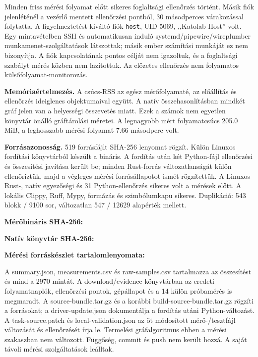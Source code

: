 \documentclass[10pt,a4paper]{article}
\begin{document}
Minden friss mérési folyamat előtt sikeres foglaltsági ellenőrzés történt.
Másik fiók jelenléténél a vezérlő mentett ellenőrzési pontból, 30 másodperces
várakozással folytatta. A figyelmeztetést kiváltó fiók \texttt{host}, UID 5069,
,,Katolab Host'' volt. Egy mintavételben SSH és automatikusan induló
systemd/pipewire/wireplumber munkamenet-szolgáltatások látszottak; másik ember
számítási munkáját ez nem bizonyítja. A fiók kapcsolatának pontos célját nem
igazoltuk, és a foglaltsági szabályt mérés közben nem lazítottuk.
Az előzetes ellenőrzés nem folyamatos külsőfolyamat-monitorozás.

\textbf{Memóriaértelmezés.} A csúcs-RSS az egész mérőfolyamaté, az előállítás és
ellenőrzés ideiglenes objektumaival együtt. A natív összehasonlításban mindkét gráf
jelen van a helyességi összevetés miatt. Ezek a számok nem egyetlen könyvtár
önálló gráftárolási méretei. A legnagyobb mért folyamatcsúcs 205.0 MiB, a
leghosszabb mérési folyamat 7.66 másodperc volt.

\textbf{Forrásazonosság.} 519 forrásfájlt SHA-256 lenyomat rögzít. Külön Linuxos
fordítási könyvtárból készült a bináris. A fordítás után két Python-fájl ellenőrzési
és összesítési javítása került be; minden Rust-forrás változatlanságát külön
ellenőriztük, majd a végleges mérési forrásállapotot ismét rögzítettük.
A Linuxos Rust-, natív egyezőségi és 31 Python-ellenőrzés sikeres volt a mérések előtt.
A lokális Clippy, Ruff, Mypy, formázás és szimbólumkapu sikeres.
Duplikáció: 543 blokk / 9100 sor, változatlan 547 / 12629 alapérték mellett.

\textbf{Mérőbináris SHA-256:} 

\textbf{Natív könyvtár SHA-256:} 

\textbf{Mérési forráskészlet tartalomlenyomata:} 

A summary.json, measurements.csv és raw-samples.csv tartalmazza az összesítést és
mind a 2970 mintát. A download/evidence könyvtárban az eredeti folyamatnaplók,
ellenőrzési pontok, gépállapot és a 14 külön próbamérés is megmaradt.
A source-bundle.tar.gz és a korábbi build-source-bundle.tar.gz rögzíti a forrásokat;
a driver-update.json dokumentálja a fordítás utáni Python-változást.
A task-source.patch és local-validation.json az öt módosított mérő-/tesztfájl
változását és ellenőrzését írja le. Termelési gráfalgoritmus ebben a mérési
szakaszban nem változott. Függőség, commit és push nem került hozzá.
A saját távoli mérési szolgáltatások leálltak.
\end{document}
